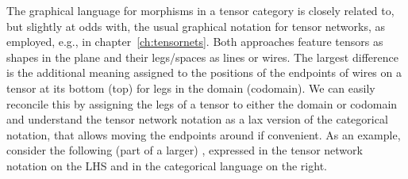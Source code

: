 The graphical language for morphisms in a tensor category is closely related to, but slightly at odds with, the usual graphical notation for tensor networks, as employed, e.g., in chapter~\ref{ch:tensornets}.
%
Both approaches feature tensors as shapes in the plane and their legs/spaces as lines or wires.
%
The largest difference is the additional meaning assigned to the positions of the endpoints of wires on a tensor at its bottom (top) for legs in the domain (codomain).
%
We can easily reconcile this by assigning the legs of a tensor to either the domain or codomain and understand the tensor network notation as a lax version of the categorical notation, that allows moving the endpoints around if convenient.
%
As an example, consider the following (part of a larger) , expressed in the tensor network notation on the LHS and in the categorical language on the right.
